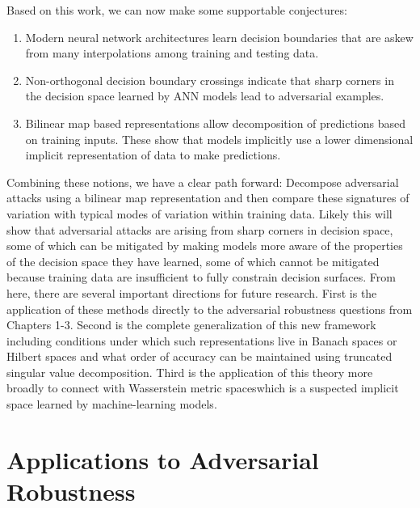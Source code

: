 Based on this work, we can now make some supportable conjectures:

\begin{enumerate}
  \item Modern neural network architectures learn decision boundaries
    that are askew from many interpolations among training and testing
    data.
  \item Non-orthogonal decision boundary crossings indicate that
    sharp corners in the decision space learned by ANN models lead
    to adversarial examples.
  \item Bilinear map based representations allow decomposition of
    predictions based on training inputs. These show that models
    implicitly use a lower dimensional implicit representation of data
    to make predictions.
\end{enumerate}

Combining these notions, we have a clear path forward:
    Decompose adversarial attacks using a bilinear map
    representation and then compare these signatures of variation with
    typical modes of variation within training data.
Likely this will show that adversarial attacks are arising
    from sharp corners in decision space, some of which can be
    mitigated by making models more aware of the properties of the
    decision space they have learned, some of which cannot be
    mitigated because training data are insufficient to fully
    constrain decision surfaces. 
From here, there are several important directions for
future research. First is the application of these methods directly to
the adversarial robustness questions from Chapters 1-3. Second is the
complete generalization of this new framework including conditions
under which such representations live in Banach spaces or Hilbert
spaces and what order of accuracy can be maintained using truncated
singular value decomposition. Third is the application of this theory more
broadly to connect with Wasserstein metric spaceswhich is a suspected implicit space learned by machine-learning models. 

\section{Applications to Adversarial Robustness}

